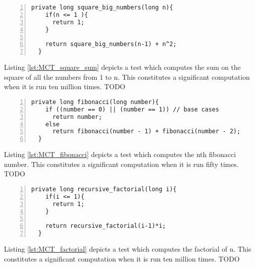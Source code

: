 \documentclass{article} %
\begin{document}
\begin{lstlisting}[caption={Measuring Computation Time - Sum of Squares},label={lst:MCT_square_sum},numbers=left]
  private long square_big_numbers(long n){
    if(n <= 1 ){
      return 1;
    }

    return square_big_numbers(n-1) + n^2;
  }
\end{lstlisting}
Listing \ref{lst:MCT_square_sum} depicts a test which computes the sum on the square of all the numbers from 1 to n. This constitutes a significant computation when it is run ten million times.
TODO

\begin{lstlisting}[caption={Measuring Computation Time - Fibonacci},label={lst:MCT_fibonacci},numbers=left]
private long fibonacci(long number){
    if ((number == 0) || (number == 1)) // base cases
      return number;
    else
      return fibonacci(number - 1) + fibonacci(number - 2);
  }
\end{lstlisting}
Listing \ref{lst:MCT_fibonacci} depicts a test which computes the nth fibonacci number. This constitutes a significant computation when it is run fifty times.
TODO

\begin{lstlisting}[caption={Measuring Computation Time - Factorial},label={lst:MCT_factorial},numbers=left]
  private long recursive_factorial(long i){
    if(i <= 1){
      return 1;
    }

    return recursive_factorial(i-1)*i;
  }
\end{lstlisting}
Listing \ref{lst:MCT_factorial} depicts a test which computes the factorial of n. This constitutes a significant computation when it is run ten million times.
TODO
\end{document}
